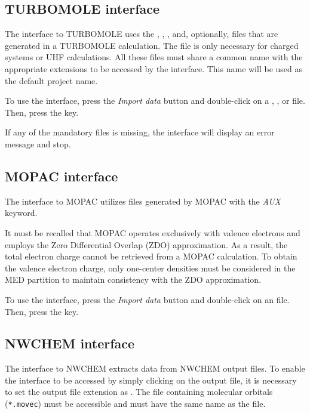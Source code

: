 \documentclass[10pt]{article}
\begin{document}
\subsection{TURBOMOLE interface \label{sec:5.4}}

The interface to TURBOMOLE uses the \basis{ }, \mos{ }, \coords{ }, and,
optionally, \control{ } files that are generated in a TURBOMOLE calculation.
The \control{ } file is only necessary for charged systems or UHF
calculations. All these files must share a common name with the appropriate 
extensions to be accessed by the interface. This name will be used as the default project name.

To use the interface, press the {\it Import data} button \teclapuntos and double-click
on a \basis{ }, \mos{ }, or \coords{ } file. Then, press the \exec key.

If any of the mandatory files is missing, the interface will display an error message and stop.

\subsection{MOPAC interface \label{sec:5.5}}

The interface to MOPAC utilizes \aux{ } files generated by MOPAC with the {\it AUX} keyword.

It must be recalled that MOPAC operates exclusively with valence electrons and employs the 
Zero Differential Overlap (ZDO) approximation.
As a result, the total electron charge cannot be retrieved from a MOPAC calculation.
To obtain the valence electron charge, only one-center densities must be considered 
in the MED partition to maintain consistency with the ZDO approximation.

To use the interface, press the {\it Import data} button \teclapuntos and double-click
on an \aux{ } file. Then, press the \exec key.


\subsection{NWCHEM interface \label{sec:5.6}}

The interface to NWCHEM extracts data from NWCHEM output files. 
To enable the interface to be accessed by simply clicking on the output file, it is necessary to 
set the output file extension as \nwcout{ }. The file containing molecular orbitals (\texttt{*.movec})
must be accessible and must have the same name as the \nwcout{ } file.
\end{document}
